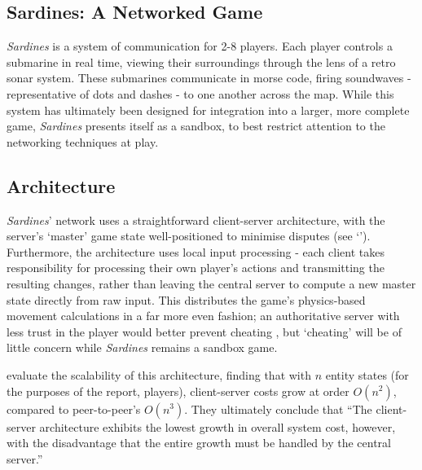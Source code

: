 \documentclass[a4paper, 9pt]{article}
\begin{document}
\graphicspath{{./Images/}}
\begin{flushleft}

\section*{Sardines: A Networked Game}

\textit{Sardines} is a system of communication for 2-8 players. Each player controls a submarine in real time, viewing their surroundings through the lens of a retro sonar system. These submarines communicate in morse code, firing soundwaves - representative of dots and dashes - to one another across the map. While this system has ultimately been designed for integration into a larger, more complete game, \textit{Sardines} presents itself as a sandbox, to best restrict attention to the networking techniques at play.

\subsection*{Architecture}\label{Architecture}

\textit{Sardines}' network uses a straightforward client-server architecture, with the server's `master' game state well-positioned to minimise disputes (see `'). Furthermore, the architecture uses local input processing - each client takes responsibility for processing their own player's actions and transmitting the resulting changes, rather than leaving the central server to compute a new master state directly from raw input. This distributes the game's physics-based movement calculations in a far more even fashion; an authoritative server with less trust in the player would better prevent cheating \citep{gmbta10}, but `cheating' will be of little concern while \textit{Sardines} remains a sandbox game.

\vspace{5pt}\noindent
\citeauthor{bauer04} \citeyearpar{bauer04} evaluate the scalability of this architecture, finding that with $n$ entity states (for the purposes of the report, players), client-server costs grow at order $O(n^2)$, compared to peer-to-peer's $O(n^3)$. They ultimately conclude that ``The client-server architecture exhibits the lowest growth in overall system cost, however, with the disadvantage that the entire growth must be handled by the central server.''  


\end{flushleft}
\end{document}
